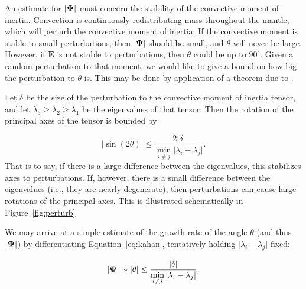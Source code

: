 \documentclass[extra,mreferee]{gji}
\begin{document}
An estimate for $\vert \mitbf{\Psi} \vert$ must concern the stability of the convective moment of inertia. 
Convection is continuously redistributing mass throughout the mantle, which will perturb the convective moment of inertia.  
If the convective moment is stable to small perturbations, then $\vert \mitbf{\Psi} \vert$ should be small, 
and $\theta$ will never be large.
However, if $\mathbf{E}$ is not stable to perturbations, then $\theta$ could be up to $90^\circ$. 
Given a random perturbation to that moment, we would like to give a bound on how big the perturbation to $\theta$ is. 
This may be done by application of a theorem due to \citet{davis1970rotation}.

Let $\delta$ be the size of the perturbation to the convective moment of inertia tensor, and let $\lambda_3 \ge \lambda_2 \ge \lambda_1$ be the eigenvalues of that tensor.  
Then the rotation of the principal axes of the tensor is bounded by

\begin{equation}
\vert \sin(2 \theta) \vert \le \frac{ 2 \vert \delta \vert}{ \displaystyle \min_{i \neq j} \vert \lambda_i - \lambda_j \vert }.
\label{eq:kahan}
\end{equation} 
That is to say, if there is a large difference between the eigenvalues, this stabilizes axes to perturbations.  
If, however, there is a small difference between the eigenvalues (i.e., they are nearly degenerate), then perturbations can cause large rotations of the principal axes.
This is illustrated schematically in Figure~\ref{fig:perturb}

We may arrive at a simple estimate of the growth rate of the angle $\theta$ (and thus $\vert \mitbf{\Psi} \vert$) 
by differentiating Equation~\eqref{eq:kahan}, tentatively holding $\vert \lambda_i - \lambda_j \vert$ fixed:

\begin{equation}
\vert \mitbf{\Psi} \vert \sim \vert \dot{\theta} \vert \le \frac{ \vert \dot{\delta} \vert}{ \displaystyle \min_{i \neq j} \vert \lambda_i - \lambda_j \vert }.
\label{eq:grow_perturbation}
\end{equation} 
\end{document}
